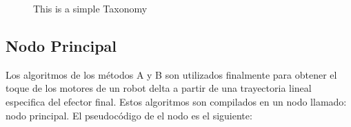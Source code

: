 \begin{center}
\begin{figure}[H]
            
                \caption{This is a simple Taxonomy}
                \label{fig:my_label}
        \end{figure}
 \end{center}
   
    \newpage
    
    \subsection{Nodo Principal}
    Los algoritmos de los métodos A y B son utilizados finalmente para obtener el toque de los motores de un robot delta a partir de una trayectoria lineal especifica del efector final. Estos algoritmos son compilados en un nodo llamado: nodo principal. El pseudocódigo de el nodo es el siguiente:     
    
      \hspace{1cm}


